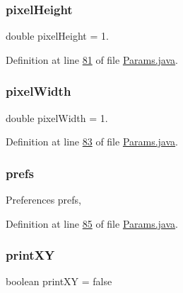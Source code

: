 \subsubsection{\texorpdfstring{pixel\+Height}{pixelHeight}}
{\footnotesize\ttfamily double pixel\+Height = 1.\hspace{0.3cm}{\ttfamily [static]}}



Definition at line \hyperlink{_params_8java_source_l00081}{81} of file \hyperlink{_params_8java_source}{Params.\+java}.

\hypertarget{classdata_1_1_params_a6bc7d1b46eaf3b2ebdc0bab5d9634c79}{}\label{classdata_1_1_params_a6bc7d1b46eaf3b2ebdc0bab5d9634c79} 
\subsubsection{\texorpdfstring{pixel\+Width}{pixelWidth}}
{\footnotesize\ttfamily double pixel\+Width = 1.\hspace{0.3cm}{\ttfamily [static]}}



Definition at line \hyperlink{_params_8java_source_l00083}{83} of file \hyperlink{_params_8java_source}{Params.\+java}.

\hypertarget{classdata_1_1_params_a77f70a9d88156f5f7dbdd99bfaaee64e}{}\label{classdata_1_1_params_a77f70a9d88156f5f7dbdd99bfaaee64e} 
\subsubsection{\texorpdfstring{prefs}{prefs}}
{\footnotesize\ttfamily Preferences prefs\hspace{0.3cm}{\ttfamily [static]}, {\ttfamily [private]}}



Definition at line \hyperlink{_params_8java_source_l00085}{85} of file \hyperlink{_params_8java_source}{Params.\+java}.

\hypertarget{classdata_1_1_params_ae8b85275ab9c5375a3d35dcb7cd8332f}{}\label{classdata_1_1_params_ae8b85275ab9c5375a3d35dcb7cd8332f} 
\subsubsection{\texorpdfstring{print\+XY}{printXY}}
{\footnotesize\ttfamily boolean print\+XY = false\hspace{0.3cm}{\ttfamily [static]}}

